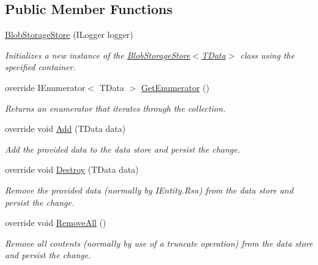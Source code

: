 \subsection*{Public Member Functions}
\begin{DoxyCompactItemize}
\item 
\hyperlink{classCqrs_1_1Azure_1_1BlobStorage_1_1BlobStorageStore_ae1979c63b97dea8e207dda7b0087ee6b_ae1979c63b97dea8e207dda7b0087ee6b}{Blob\+Storage\+Store} (I\+Logger logger)
\begin{DoxyCompactList}\small\item\em Initializes a new instance of the \hyperlink{classCqrs_1_1Azure_1_1BlobStorage_1_1BlobStorageStore_ae1979c63b97dea8e207dda7b0087ee6b_ae1979c63b97dea8e207dda7b0087ee6b}{Blob\+Storage\+Store$<$\+T\+Data$>$} class using the specified container. \end{DoxyCompactList}\item 
override I\+Enumerator$<$ T\+Data $>$ \hyperlink{classCqrs_1_1Azure_1_1BlobStorage_1_1BlobStorageStore_a7b106644bd8bfe5b1b5e5ef7bc279769_a7b106644bd8bfe5b1b5e5ef7bc279769}{Get\+Enumerator} ()
\begin{DoxyCompactList}\small\item\em Returns an enumerator that iterates through the collection. \end{DoxyCompactList}\item 
override void \hyperlink{classCqrs_1_1Azure_1_1BlobStorage_1_1BlobStorageStore_a527ef0e0d39f9e01f4112b6bc90129b2_a527ef0e0d39f9e01f4112b6bc90129b2}{Add} (T\+Data data)
\begin{DoxyCompactList}\small\item\em Add the provided {\itshape data}  to the data store and persist the change. \end{DoxyCompactList}\item 
override void \hyperlink{classCqrs_1_1Azure_1_1BlobStorage_1_1BlobStorageStore_a7e4870567b393327563d131cb25151e0_a7e4870567b393327563d131cb25151e0}{Destroy} (T\+Data data)
\begin{DoxyCompactList}\small\item\em Remove the provided {\itshape data}  (normally by I\+Entity.\+Rsn) from the data store and persist the change. \end{DoxyCompactList}\item 
override void \hyperlink{classCqrs_1_1Azure_1_1BlobStorage_1_1BlobStorageStore_a4371b95250e51b8462d8ab33b6f3fe9e_a4371b95250e51b8462d8ab33b6f3fe9e}{Remove\+All} ()
\begin{DoxyCompactList}\small\item\em Remove all contents (normally by use of a truncate operation) from the data store and persist the change. \end{DoxyCompactList}\item 

\end{DoxyCompactItemize}
